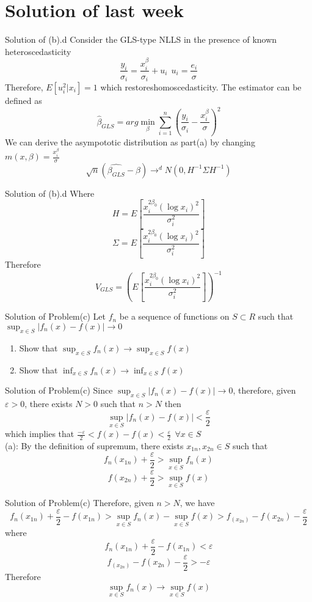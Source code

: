 \documentclass{beamer}
\begin{document}
\section{Solution of last week}
\begin{frame}{Solution of (b).d}
	Consider the GLS-type NLLS in the presence of known heteroscedasticity
	\[\frac{y_i}{\sigma_i} = \frac{x^{\beta}_i}{\sigma_i} + u_i \ \ u_i = \frac{e_i}{\sigma}\]
	Therefore, $E[u^2_i|x_i] = 1$ which restoreshomoscedasticity. The estimator can be defined as 
	\[\hat{\beta}_{GLS} = arg\min_{\beta} \sum^n_{i=1} (\frac{y_i}{\sigma_i} - \frac{x^{\beta}_i}{\sigma})^2\]
	We can derive the asympototic distribution as part(a) by changing $m(x,\beta) = \frac{x^{\beta}_i}{\sigma}$
	\[\sqrt{n}(\hat{\beta_{GLS}} - \beta) \rightarrow^d N(0,H^{-1}\Sigma H^{-1})\]
\end{frame}
\begin{frame}{Solution of (b).d}
	Where
	\[H = E[\frac{x^{2 \beta_0}_i (\log x_i)^2}{\sigma^2_i}]\]
	\[\Sigma = E[\frac{x^{2 \beta_0}_i (\log x_i)^2}{\sigma^2_i}]\]
	Therefore
	\[V_{GLS} = (E[\frac{x^{2 \beta_0}_i (\log x_i)^2}{\sigma^2_i}])^{-1}\]
\end{frame}
\begin{frame}{Solution of Problem(c)}
	Let $f_n$ be a sequence of functions on $S \subset R$ such that $\sup_{x \in S} |f_n(x) - f(x)| \rightarrow 0$
	\begin{enumerate}
		\item Show that $\sup_{x \in S} f_n(x) \rightarrow \sup_{x \in S} f(x)$
		\item Show that $\inf_{x \in S} f_n(x) \rightarrow \inf_{x \in S} f(x)$
	\end{enumerate}
\end{frame}
\begin{frame}{Solution of Problem(c)}
	Since $\sup_{x \in S} |f_n(x) - f(x)| \rightarrow 0$, therefore, given $\varepsilon >0$, there exists $N>0$ such that $n > N$ then
	\[\sup_{x \in S} |f_n(x) - f(x)| < \frac{\varepsilon}{2}\]
	which implies that $\frac{-\varepsilon}{2}< f(x) - f(x) < \frac{\varepsilon}{2} \ \ \forall x \in S$\\
	(a): By the definition of supremum, there exists $x_{1n},x_{2n} \in S$ such that
	\[f_n(x_{1n}) + \frac{\varepsilon}{2} > \sup_{x \in S} f_n(x)\]
	\[f(x_{2n}) + \frac{\varepsilon}{2} > \sup_{x \in S} f(x)\]
\end{frame}
\begin{frame}{Solution of Problem(c)}
	Therefore, given $n>N$, we have
	\[ f_n(x_{1n}) + \frac{\varepsilon}{2} - f(x_{1n})> \sup_{x \in S} f_n(x) - \sup_{x \in S} f(x) > f_(x_{2n}) - f(x_{2n}) - \frac{\varepsilon}{2}\]
	where
	\[f_n(x_{1n}) + \frac{\varepsilon}{2} - f(x_{1n}) < \varepsilon\]
	\[f_(x_{2n}) - f(x_{2n}) - \frac{\varepsilon}{2} > - \varepsilon\]
	Therefore
	\[\sup_{x \in S} f_n(x) \rightarrow \sup_{x \in S} f(x)\]
\end{frame}
\end{document}
